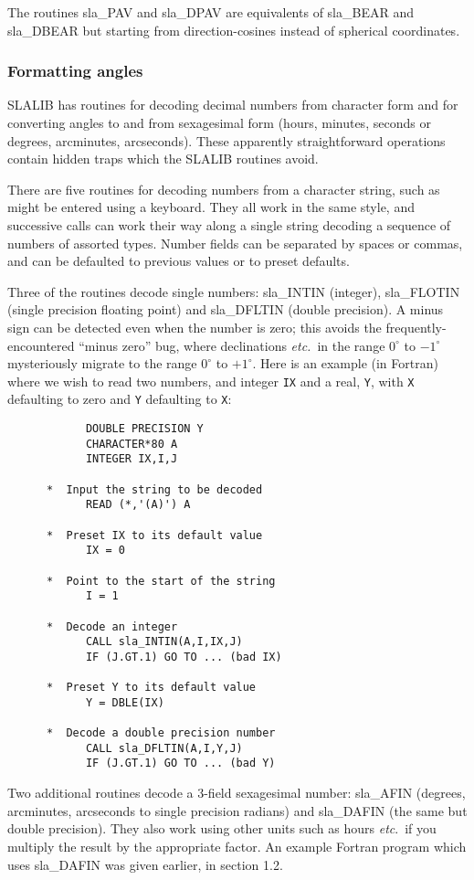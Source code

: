 \documentclass[11pt,twoside]{article}
\begin{document}
The routines
sla\_PAV and
sla\_DPAV
are equivalents of sla\_BEAR and sla\_DBEAR but starting from
direction-cosines instead of spherical coordinates.

\subsubsection{Formatting angles}
SLALIB has routines for decoding decimal numbers
from character form and for converting angles to and from
sexagesimal form (hours, minutes, seconds or degrees,
arcminutes, arcseconds).  These apparently straightforward
operations contain hidden traps which the SLALIB routines
avoid.

There are five routines for decoding numbers from a character
string, such as might be entered using a keyboard.
They all work in the same style, and successive calls
can work their way along a single string decoding
a sequence of numbers of assorted types.  Number
fields can be separated by spaces or commas, and can be defaulted
to previous values or to preset defaults.

Three of the routines decode single numbers:
sla\_INTIN
(integer),
sla\_FLOTIN
(single precision floating point) and
sla\_DFLTIN
(double precision).  A minus sign can be
detected even when the number is zero;  this avoids
the frequently-encountered ``minus zero'' bug, where
declinations {\it etc.}\ in
the range $0^{\circ}$ to $-1^{\circ}$ mysteriously migrate to
the range $0^{\circ}$ to $+1^{\circ}$.
Here is an example (in Fortran) where we wish to
read two numbers, and integer {\tt IX} and a real, {\tt Y},
with {\tt X} defaulting to zero and {\tt Y} defaulting to
{\tt X}:
\goodbreak
\begin{verbatim}
            DOUBLE PRECISION Y
            CHARACTER*80 A
            INTEGER IX,I,J

      *  Input the string to be decoded
            READ (*,'(A)') A

      *  Preset IX to its default value
            IX = 0

      *  Point to the start of the string
            I = 1

      *  Decode an integer
            CALL sla_INTIN(A,I,IX,J)
            IF (J.GT.1) GO TO ... (bad IX)

      *  Preset Y to its default value
            Y = DBLE(IX)

      *  Decode a double precision number
            CALL sla_DFLTIN(A,I,Y,J)
            IF (J.GT.1) GO TO ... (bad Y)
\end{verbatim}
\goodbreak
Two additional routines decode a 3-field sexagesimal number:
sla\_AFIN
(degrees, arcminutes, arcseconds to single
precision radians) and
sla\_DAFIN
(the same but double precision).  They also
work using other units such as hours {\it etc}.\ if
you multiply the result by the appropriate factor.  An example
Fortran program which uses
sla\_DAFIN
was given earlier, in section 1.2.
\end{document}
